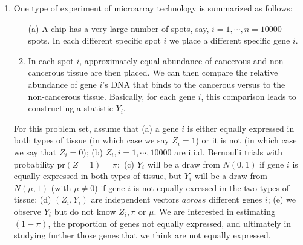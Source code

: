 \documentclass[letterpaper, 12pt]{article}\usepackage[]{graphicx}\usepackage[]{color}
\newcommand{\pr}{\text{pr}}
\newcommand{\sbs}{\;|\;} %
\begin{document}
\begin{enumerate}
\begin{enumerate}[(i)]
\begin{proof}
Finally, calculating,
\begin{align*}
E(Y \mid \mu, \pi)
&=
\int y(\phi(y)\pi
+
\phi(y-\mu)(1-\pi))dy
\\
&=
\pi \int y \phi(y)dy
+
(1-\pi)
\int
y \phi(y -\mu)
dy
\\
&=
(1-\pi)\mu
\end{align*}
\end{proof}
\item
Find $E(Y^2 \sbs \mu, \pi)$.
\begin{proof}
Calculating,
\begin{align*}
E(Y^2 \sbs \mu, \pi)
&=
\int y^2(\phi(y)\pi
+
\phi(y-\mu)(1-\pi))dy
\\
&=
\pi \int y^2 \phi(y)dy
+
(1-\pi)
\int
y^2
\phi(y -\mu)
dy
\\
&=
\pi + (1-\pi)(1 + \mu^2)
\\
&=
1+ (1 - \pi)\mu^2
\end{align*}
\end{proof}
\end{enumerate}
\item
One type of experiment of microarray technology is summarized as follows:
\begin{enumerate}
\item[(a)]
A chip has a very large number of spots, say, $i = 1, \cdots, n = 10000$ spots. In each different specific spot $i$ we place a different specific gene $i$.
\item
In each spot $i$, approximately equal abundance of cancerous and non-cancerous tissue are then placed. 
We can then compare the relative abundance of gene $i$'s DNA 
that binds to the cancerous versus to the non-cancerous tissue.
Basically, for each gene $i$, this comparison leads to constructing a statistic $Y_i$.
\end{enumerate}
For this problem set, assume that (a) a gene $i$ is either equally expressed in both types of tissue (in which case we say $Z_i = 1$) or it is not (in which case we say that $Z_i = 0$);
(b) $Z_i, i=1, \cdots, 10000$ are i.i.d. Bernoulli trials with probability $\pr(Z=1) = \pi;$
(c) $Y_i$ will be a draw from $N(0,1)$ if gene $i$ is equally expressed in both types of tissue, but $Y_i$ will be a draw from $N(\mu,1)$ (with $\mu \neq 0$) if gene $i$ is not equally exressed in the two types of tissue;
(d) $(Z_i, Y_i)$ are independent vectors $\underline{across}$ different genes $i$;
(e) we observe $Y_i$ but do not know $Z_i, \pi$ or $\mu$. 
We are interested in estimating $(1-\pi)$, the proportion of genes not equally expressed, and ultimately in studying further those genes that we think are not equally expressed.


\end{enumerate}
\end{document}
